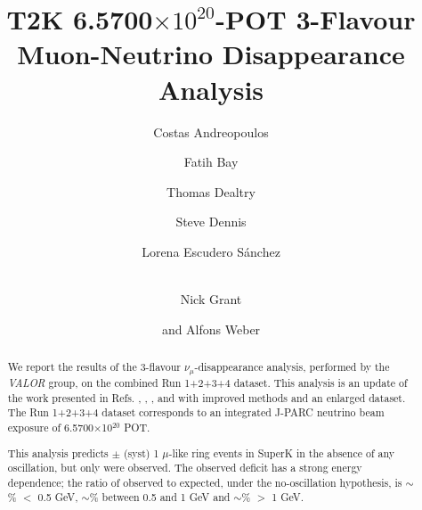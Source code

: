 %
%

\begin{frontmatter}

\title{
  T2K 6.5700$\times10^{20}$-POT 3-Flavour Muon-Neutrino Disappearance Analysis
}

\vspace*{0.7cm}

\author[RAL,LIV]  {Costas Andreopoulos}
\author[ETHZ]     {Fatih Bay}
\author[RAL,OXF]  {Thomas Dealtry}
\author[RAL,WAR]  {Steve Dennis}
\author[IFIC]     {Lorena Escudero S\'anchez}
\author[LANCS]    {\\Nick Grant}
\author[RAL,OXF]  {and Alfons Weber}

\address[RAL]   {Science \& Technology Facilities Council (STFC), Rutherford Appleton Laboratory,\\ Harwell Oxford Campus, OX11 0QX, UK}
\address[LIV]   {University of Liverpool, Physics Department,\\ Liverpool, L69 7ZE, UK} 
\address[ETHZ]  {ETH Zurich, Institute for Particle Physics,\\ 8092 Zurich, Switzerland}
\address[OXF]   {University of Oxford, Subdepartment of Particle Physics,\\ Oxford, OX1 3RH, UK}
\address[WAR]   {University of Warwick, Physics Department,\\ Coventry, CV4 7AL, UK}
\address[IFIC]  {CSIC and University of Valencia, Instituto de Fisica Corpuscular, \\ E-46071 Valencia, Spain}
\address[LANCS] {Lancaster University, Physics Department,\\ Lancaster, LA1 4YB, UK}

%
%

\begin{abstract}

We report the results of the
3-flavour $\nu_{\mu}$-disappearance analysis, performed by the {\em VALOR} group,
on the combined Run 1+2+3+4 dataset.
This analysis is an update of the work presented in Refs. 
\cite{OurRun1DisappAnalysis},
\cite{OurRun12DisappAnalysis}, 
\cite{OurRun12DisappAnalysis3Flavour},
\cite{OurRun123DisappAnalysis3Flavour} and
\cite{OurRun1234aDisappAnalysis3Flavour}
with improved methods and an enlarged dataset.
The Run 1+2+3+4 dataset corresponds to an integrated J-PARC neutrino beam
exposure of 6.5700$\times$10$^{20}$ POT.

This analysis predicts \NskNoOscExpectation $\pm$ \NskNoOscExpectationError (syst)
1 $\mu$-like ring events in SuperK in the absence of any oscillation,
but only \NskObserved were observed. The observed deficit has a strong energy dependence;
the ratio of observed to expected, under the no-oscillation hypothesis, is
$\sim$\NskNoOscRatioLow\% $<$ 0.5 GeV, 
$\sim$\NskNoOscRatioMid\% between 0.5 and 1 GeV and 
$\sim$\NskNoOscRatioHig\% $>$ 1 GeV.


\end{abstract}
\end{frontmatter}
